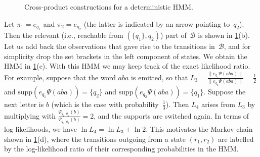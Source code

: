 \documentclass[a4paper,UKenglish,cleveref, autoref,mathscr]{lipics-v2019}
\newcommand{\1}{\mathbbm{1}}
\newcommand{\supp}{\mathrm{supp}}
\newcommand{\liexp}{\lim_{n\rightarrow\infty} \frac1n \ln L_n}
\newcommand{\B}{\mathcal{B}}
\newcommand*{\DrawBoundingBox}[1][]{%
    \draw [
        draw=gray,
    ]
    ([shift={(-1pt,-1pt)}]current bounding box.south west)
    rectangle ([shift={(1pt,1pt)}]current bounding box.north east);
}
\begin{document}
\begin{example}
\begin{figure}[ht]
\begin{center}
\end{center}
\caption{Cross-product constructions for a deterministic HMM.}
\label{fig:det1}
\end{figure}
Let $\pi_1 = e_{q_1}$ and $\pi_2 = e_{q_2}$ (the latter is indicated by an arrow pointing to~$q_2$).
Then the relevant (i.e., reachable from $(\{q_1\}, q_2)$) part of~$\B$ is shown in \cref{fig:det1}(b).
Let us add back the observations that gave rise to the transitions in~$\B$, and for simplicity drop the set brackets in the left component of states.
We obtain the HMM in \cref{fig:det1}(c).
With this HMM we may keep track of the exact likelihood ratio.
For example, suppose that the word $a b a$ is emitted, so that $L_3 = \frac{\|e_{q_1} \Psi(a b a)\|}{\|e_{q_2} \Psi(a b a)\|} = \frac12$ and $\supp(e_{q_1} \Psi(a b a)) = \{q_2\}$ and $\supp(e_{q_2} \Psi(a b a)) = \{q_1\}$.
Suppose the next letter is $b$ (which is the case with probability~$\frac13$).
Then $L_4$ arises from $L_3$ by multiplying with $\frac{\Psi_{q_2,q_1}(b)}{\Psi_{q_1,q_2}(b)} = 2$, and the supports are switched again.
In terms of log-likelihoods, we have $\ln L_4 = \ln L_3 + \ln 2$.
This motivates the Markov chain shown in \cref{fig:det1}(d), where the transitions outgoing from a state $(r_1,r_2)$ are labelled by the log-likelihood ratio of their corresponding probabilities in the HMM.

\end{example}
\end{document}
